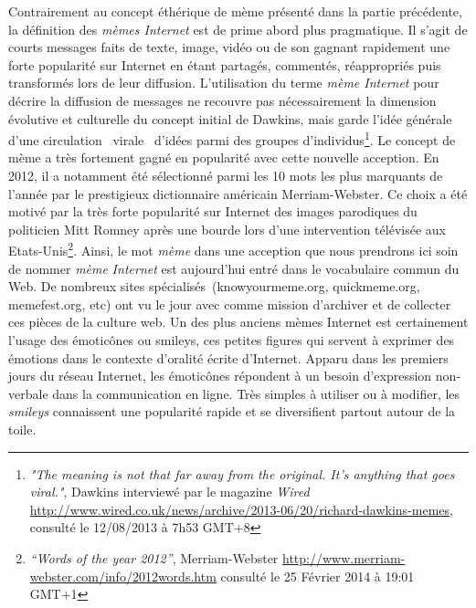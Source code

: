 Contrairement au concept \'eth\'erique de m\`eme pr\'esent\'e dans la partie pr\'ec\'edente, la d\'efinition des \textit{m\`emes Internet }est de prime abord plus pragmatique. Il s{\textquoteright}agit de courts messages faits de texte, image, vid\'eo ou de son gagnant rapidement une forte popularit\'e sur Internet en \'etant partag\'es, comment\'es, r\'eappropri\'es puis transform\'es lors de leur diffusion. L{\textquoteright}utilisation du terme \textit{m\`eme Internet }pour d\'ecrire la diffusion de messages ne recouvre pas n\'ecessairement la dimension \'evolutive et culturelle du concept initial de Dawkins, mais garde l{\textquoteright}id\'ee g\'en\'erale d{\textquoteright}une circulation {\guillemotleft}~virale~{\guillemotright} d{\textquoteright}id\'ees parmi des groupes d{\textquoteright}individus\footnote{ \textit{"The meaning is not that far away from the original. It's anything that goes viral."}, Dawkins interview\'e par le magazine \textit{Wired} \url{http://www.wired.co.uk/news/archive/2013-06/20/richard-dawkins-memes}, consult\'e le 12/08/2013 \`a 7h53 GMT+8}. Le concept de m\`eme a tr\`es fortement gagn\'e en popularit\'e avec cette nouvelle acception. En 2012, il a notamment \'et\'e s\'electionn\'e parmi les 10 mots les plus marquants de l{\textquoteright}ann\'ee par le prestigieux dictionnaire am\'ericain Merriam-Webster. Ce choix a \'et\'e motiv\'e par la tr\`es forte popularit\'e sur Internet des images parodiques du politicien Mitt Romney apr\`es une bourde lors d{\textquoteright}une intervention t\'el\'evis\'ee aux Etats-Unis\footnote{ \textit{{\textquotedblleft}Words of the year 2012{\textquotedblright}}, Merriam-Webster \url{http://www.merriam-webster.com/info/2012words.htm} consult\'e le 25 F\'evrier 2014 \`a 19:01 GMT+1}. Ainsi, le mot \textit{m\`eme }dans une acception que nous prendrons ici soin de nommer \textit{m\`eme} \textit{Internet} est aujourd{\textquoteright}hui entr\'e dans le vocabulaire commun du Web. De nombreux sites sp\'ecialis\'es~(knowyourmeme.org, quickmeme.org, memefest.org, etc) ont vu le jour avec comme mission d{\textquoteright}archiver et de collecter ces pi\`eces de la culture web. Un des plus anciens m\`emes Internet est certainement l{\textquoteright}usage des \'emotic\^ones ou smileys, ces petites figures qui servent \`a exprimer des \'emotions dans le contexte d{\textquoteright}oralit\'e \'ecrite d{\textquoteright}Internet. Apparu dans les premiers jours du r\'eseau Internet, les \'emotic\^ones r\'epondent \`a un besoin d{\textquoteright}expression non-verbale dans la communication en ligne. Tr\`es simples \`a utiliser ou \`a modifier, les \textit{smileys }connaissent une popularit\'e rapide et se diversifient partout autour de la toile.  

